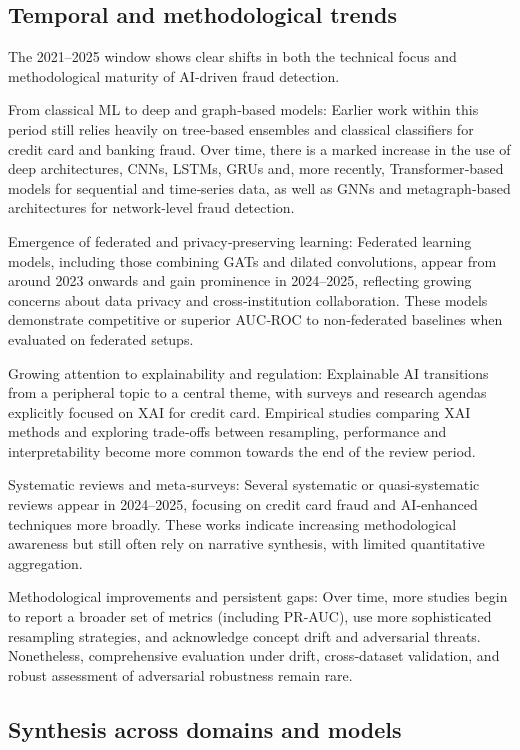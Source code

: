\documentclass[a4paper,fleqn]{cas-dc}
\begin{document}
\subsection{Temporal and methodological trends}
The 2021–2025 window shows clear shifts in both the technical focus and methodological maturity of AI‑driven fraud detection.

From classical ML to deep and graph‑based models: Earlier work within this period still relies heavily on tree‑based ensembles and classical classifiers for credit card and banking fraud. Over time, there is a marked increase in the use of deep architectures, CNNs, LSTMs, GRUs and, more recently, Transformer‑based models for sequential and time‑series data, as well as GNNs and metagraph‑based architectures for network‑level fraud detection.

Emergence of federated and privacy‑preserving learning: Federated learning models, including those combining GATs and dilated convolutions, appear from around 2023 onwards and gain prominence in 2024–2025, reflecting growing concerns about data privacy and cross‑institution collaboration. These models demonstrate competitive or superior AUC‑ROC to non‑federated baselines when evaluated on federated setups.

Growing attention to explainability and regulation: Explainable AI transitions from a peripheral topic to a central theme, with surveys and research agendas explicitly focused on XAI for credit card. Empirical studies comparing XAI methods and exploring trade‑offs between resampling, performance and interpretability become more common towards the end of the review period.

Systematic reviews and meta‑surveys: Several systematic or quasi‑systematic reviews appear in 2024–2025, focusing on credit card fraud and AI‑enhanced techniques more broadly. These works indicate increasing methodological awareness but still often rely on narrative synthesis, with limited quantitative aggregation.

Methodological improvements and persistent gaps: Over time, more studies begin to report a broader set of metrics (including PR‑AUC), use more sophisticated resampling strategies, and acknowledge concept drift and adversarial threats. Nonetheless, comprehensive evaluation under drift, cross‑dataset validation, and robust assessment of adversarial robustness remain rare.

\subsection{Synthesis across domains and models}
\end{document}
